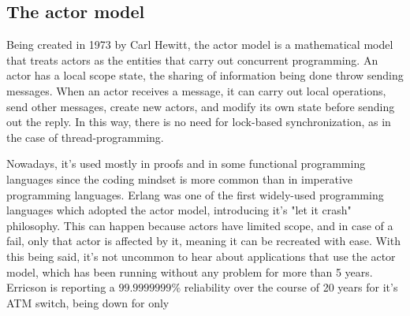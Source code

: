 \subsection{The actor model}
Being created in 1973 by Carl Hewitt, the actor model is a mathematical model that treats actors as the entities that carry out concurrent programming. An actor has a local scope state, the sharing of information being done throw sending messages. When an actor receives a message, it can carry out local operations, send other messages, create new actors, and modify its own state before sending out the reply. In this way, there is no need for lock-based synchronization, as in the case of thread-programming.

Nowadays, it's used mostly in proofs and in some functional programming languages since the coding mindset is more common than in imperative programming languages. Erlang was one of the first widely-used programming languages which adopted the actor model, introducing it's "let it crash" philosophy. This can happen because actors have limited scope, and in case of a fail, only that actor is affected by it, meaning it can be recreated with ease. With this being said, it's not uncommon to hear about applications that use the actor model, which has been running without any problem for more than 5 years. Erricson is reporting a $99.9999999\%$ reliability over the course of 20 years for it's ATM switch, being down for only %
